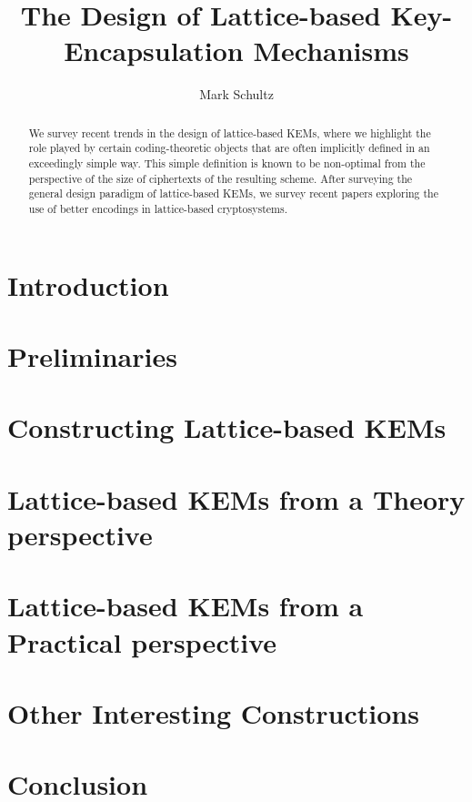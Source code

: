 \documentclass{article}
\begin{document}
	\title{The Design of Lattice-based Key-Encapsulation Mechanisms}
	\author{Mark Schultz}
	\maketitle
	\begin{abstract}
		We survey recent trends in the design of lattice-based KEMs, where we highlight the role played by certain coding-theoretic objects that are often implicitly defined in an exceedingly simple way.
		This simple definition is known to be non-optimal from the perspective of the size of ciphertexts of the resulting scheme.
		After surveying the general design paradigm of lattice-based KEMs, we survey recent papers exploring the use of better encodings in lattice-based cryptosystems.
	\end{abstract}
	
	\section{Introduction}
	
	\section{Preliminaries}
	
	\section{Constructing Lattice-based KEMs}
	
	\section{Lattice-based KEMs from a Theory perspective}
	
	\section{Lattice-based KEMs from a Practical perspective}
	
	\section{Other Interesting Constructions}
	
	\section{Conclusion}
	
	
	\printbibliography
\end{document}

